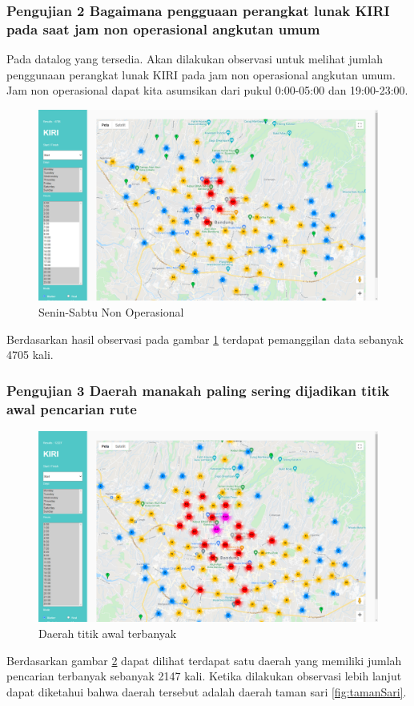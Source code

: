 \subsubsection{Pengujian 2 Bagaimana pengguaan perangkat lunak KIRI pada saat jam non operasional angkutan umum}
\label{subsec:pengujian2}
Pada datalog yang tersedia. Akan dilakukan observasi untuk melihat jumlah penggunaan perangkat lunak KIRI pada jam non operasional angkutan umum. Jam non operasional dapat kita asumsikan dari pukul 0:00-05:00 dan 19:00-23:00.
\begin{figure}[H]
	\centering  
	\includegraphics[scale=0.3]{Gambar/pengujian/senin-sabtu-non-operasional.png}  
	\caption[Senin-Sabtu Non Operasional]{Senin-Sabtu Non Operasional} 
	\label{fig:nonOperasional}
\end{figure}

Berdasarkan hasil observasi pada gambar \ref{fig:nonOperasional} terdapat pemanggilan data sebanyak 4705 kali.

\subsubsection{Pengujian 3 Daerah manakah  paling sering dijadikan titik awal pencarian rute}
\label{subsec:pengujian3}
\begin{figure}[H]
	\centering  
	\includegraphics[scale=0.3]{Gambar/pengujian/titik-tujuan-terbanyak.png}  
	\caption[Daerah titik awal terbanyak]{Daerah titik awal terbanyak } 
	\label{fig:titkAwal}
\end{figure}
Berdasarkan gambar \ref{fig:titkAwal} dapat dilihat terdapat satu daerah yang memiliki jumlah pencarian terbanyak sebanyak 2147 kali. Ketika dilakukan observasi lebih lanjut dapat diketahui bahwa daerah tersebut adalah daerah taman sari \ref{fig:tamanSari}.

